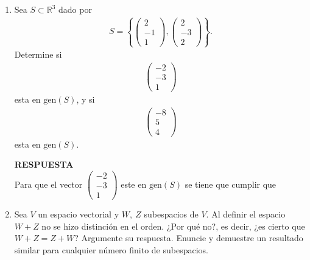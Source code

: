 \documentclass[11pt,letterpaper]{article}
\newcommand{\mR}{\mathbb{R}}
\newcommand{\res}{\textbf{RESPUESTA}\\}
\newcommand{\gen}{\text{gen}}
\begin{document}
\begin{enumerate}
\item Sea $S\subset \mR^3$ dado por 
\begin{align*}
S=\left\{\begin{pmatrix}
2\\
-1\\
1
\end{pmatrix}, \begin{pmatrix}
2\\
-3\\
2
\end{pmatrix} \right\}.
\end{align*}
Determine si \begin{align*}
\begin{pmatrix}
-2\\
-3\\
1
\end{pmatrix}
\end{align*}
esta en $\text{gen}(S)$, y si \begin{align*}
\begin{pmatrix}
-8\\
5\\
4
\end{pmatrix}
\end{align*}
esta en $\text{gen}(S)$.

\res 
Para que el vector $\begin{pmatrix}
-2\\
-3\\
1
\end{pmatrix}$
 este en $\gen (S)$ se tiene que cumplir que 

\item Sea $V$ un espacio vectorial y $W, \ Z$ subespacios de $V$. Al definir el espacio $W+Z$ no se hizo distinción en el orden. ¿Por qué no?, es decir, ¿es cierto que
$W + Z = Z + W$? Argumente su respuesta. Enuncie y demuestre un resultado similar para cualquier número finito de subespacios.


\end{enumerate}
\end{document}
